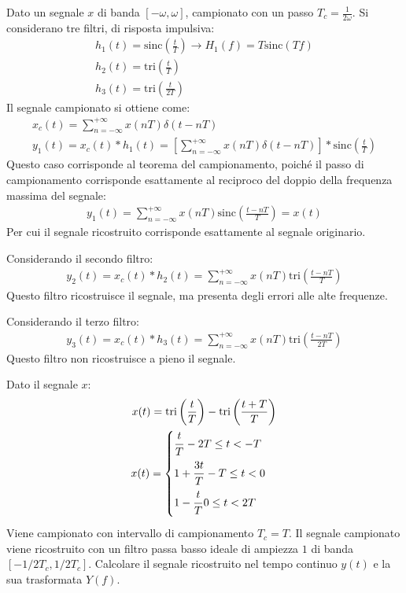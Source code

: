 \documentclass{article}
\newcommand{\sinc}{\mathrm{sinc}}
\newcommand{\tri}{\mathrm{tri}}
\begin{document}
Dato un segnale $x$ di banda $[-\omega,\omega]$, campionato con un passo $T_c=\displaystyle\frac{1}{2\omega}$. Si considerano tre filtri, di risposta impulsiva:
\begin{gather*}
    h_1(t)=\sinc\left(\displaystyle\frac{t}{T}\right)\to H_1(f)=T\sinc(Tf)\\
    h_2(t)=\tri \left(\displaystyle\frac{t}{T}\right)\\
    h_3(t)=\tri \left(\displaystyle\frac{t}{2T}\right)
\end{gather*}
Il segnale campionato si ottiene come:
\begin{gather*}
    x_c(t)=\displaystyle\sum_{n=-\infty}^{+\infty}x(nT)\delta(t-nT)\\
    y_1(t)=x_c(t)*h_1(t)=\left[\displaystyle\sum_{n=-\infty}^{+\infty}x(nT)\delta(t-nT)\right]*\sinc\left(\frac{t}{T}\right)
\end{gather*}
Questo caso corrisponde al teorema del campionamento, poiché il passo di campionamento corrisponde esattamente al reciproco del doppio della frequenza massima del segnale:
\begin{gather}
    y_1(t)=\displaystyle\sum_{n=-\infty}^{+\infty}x(nT)\sinc\left(\frac{t-nT}{T}\right)=x(t)
\end{gather}
Per cui il segnale ricostruito corrisponde esattamente al segnale originario. 

Considerando il secondo filtro:
\begin{gather}
    y_2(t)=x_c(t)*h_2(t)=\displaystyle\sum_{n=-\infty}^{+\infty}x(nT)\tri \left(\frac{t-nT}{T}\right)
\end{gather}
Questo filtro ricostruisce il segnale, ma presenta degli errori alle alte frequenze. 

Considerando il terzo filtro:
\begin{gather}
    y_3(t)=x_c(t)*h_3(t)=\displaystyle\sum_{n=-\infty}^{+\infty}x(nT)\tri \left(\frac{t-nT}{2T}\right)
\end{gather}
Questo filtro non ricostruisce a pieno il segnale. 


Dato il segnale $x$:
\begin{gather*}
    x(t)=\tri \left(\displaystyle\frac{t}{T}\right)-\tri \left(\frac{t+T}{T}\right)\\
    x(t)=\begin{cases}
        \displaystyle\frac{\strut t}{\strut T} -2T\leq t<-T\\
        1+\displaystyle\frac{\strut 3t}{\strut T} -T\leq t<0\\
        1-\displaystyle\frac{\strut t}{\strut T} 0\leq t<2T
    \end{cases}
\end{gather*}
Viene campionato con intervallo di campionamento $T_c=T$. Il segnale campionato viene ricostruito con un filtro passa basso ideale di ampiezza $1$ di banda $[-1/2T_c,1/2T_c]$. 
Calcolare il segnale ricostruito nel tempo continuo $y(t)$ e la sua trasformata $Y(f)$. 
\end{document}
